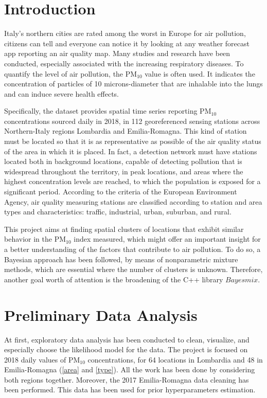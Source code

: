 \documentclass[12pt,a4paper]{article}
\begin{document}
\section{Introduction}\label{sec:intro}

Italy’s northern cities are rated among the worst in Europe for air pollution, citizens can tell and everyone can notice it by looking at any weather forecast app reporting an air quality map. Many studies and research have been conducted, especially associated with the increasing respiratory diseases. To quantify the level of air pollution, the PM$_{10}$ value is often used. It indicates the concentration of particles of 10 microns-diameter that are inhalable into the lungs and can induce severe health effects.

Specifically, the dataset provides spatial time series reporting PM$_{10}$ concentrations sourced daily in 2018, in 112 georeferenced sensing stations across Northern-Italy regions Lombardia and Emilia-Romagna.
This kind of station must be located so that it is as representative as possible of the air quality status of the area in which it is placed. In fact, a detection network must have stations located both in background locations, capable of detecting pollution that is widespread throughout the territory, in peak locations, and areas where the highest concentration levels are reached, to which the population is exposed for a significant period. According to the criteria of the European Environment Agency, air quality measuring stations are classified according to station and area types and characteristics: traffic, industrial, urban, suburban, and rural.

This project aims at finding spatial clusters of locations that exhibit similar behavior in the PM$_{10}$ index measured, which might offer an important insight for a better understanding of the factors that contribute to air pollution.
To do so, a Bayesian approach has been followed, by means of nonparametric mixture methods, which are essential where the number of clusters is unknown.
Therefore, another goal worth of attention is the broadening of the C++ library $Bayesmix$.





\newpage
\section{Preliminary Data Analysis}\label{sec:pre}
At first, exploratory data analysis has been conducted to clean,  visualize, and especially choose the likelihood model for the data. The project is focused on 2018 daily values of PM$_{10}$ concentrations, for 64 locations in Lombardia and 48 in Emilia-Romagna (\autoref{area} and \autoref{type}). All the work has been done by considering both regions together.
Moreover, the 2017 Emilia-Romagna data cleaning has been performed. This data has been used for prior hyperparameters estimation.\
\end{document}
